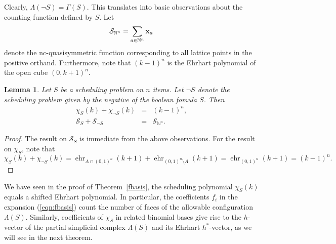 \documentclass[12pt,reqno]{amsart}
\numberwithin{definition}{section}
\newtheorem{lemma}[definition]{Lemma}
\theoremstyle{definition}
\newcommand{\NN}{\mathbb{N}}
\newcommand{\SSS}{\mathcal{S}}
\newcommand{\ehr}{\operatorname{ehr}}
\newcommand{\allow}{\Lambda} %
\newcommand{\poly}{\chi} %
\newcommand{\forb}{\Gamma} %
\begin{document}
Clearly, $\allow(\neg S)=\forb(S)$. This translates into basic observations about the counting function defined by $S$. Let 
\[
  \SSS_{\NN^n} = \sum_{a\in\NN^n} {\bf x}_a
\]
denote the nc-quasisymmetric function corresponding to all lattice points in the positive orthand. Furthermore, note that $(k-1)^n$ is the Ehrhart polynomial of the open cube $(0,k+1)^n$. 

\begin{lemma}
Let $S$ be a scheduling problem on $n$ items. Let $\neg S$ denote the scheduling problem given by the negative of the boolean fomula $S$. Then 
\begin{eqnarray*}
  \poly_{S}(k) + \poly_{\neg S}(k) &=& (k-1)^n, \\
  \SSS_S + \SSS_{\neg S} &=& \SSS_{\NN^n}.
\end{eqnarray*}
\end{lemma}


\begin{proof}
The result on $\SSS_S$ is immediate from the above observations. For the result on $\poly_S$, note that 
\[
 \poly_{S}(k) + \poly_{\neg S}(k) = \ehr_{A\cap(0,1)^n}(k+1) +  \ehr_{(0,1)^n\setminus A}(k+1) = \ehr_{(0,1)^n}(k+1) = (k-1)^n.
\]
\end{proof}

We have seen in the proof of Theorem~\ref{fbasis}, the scheduling polynomial $\chi_S(k)$ equals a shifted Ehrhart polynomial. In particular, the coefficients $f_i$ in the expansion (\ref{eqn:fbasis}) count the number of faces of the allowable configuration $\allow(S)$. Similarly, coefficients of $\chi_S$ in related binomial bases give rise to the $h$-vector of the partial simplicial complex $\allow(S)$ and its Ehrhart $h^*$-vector, as we will see in the next theorem.
\end{document}
